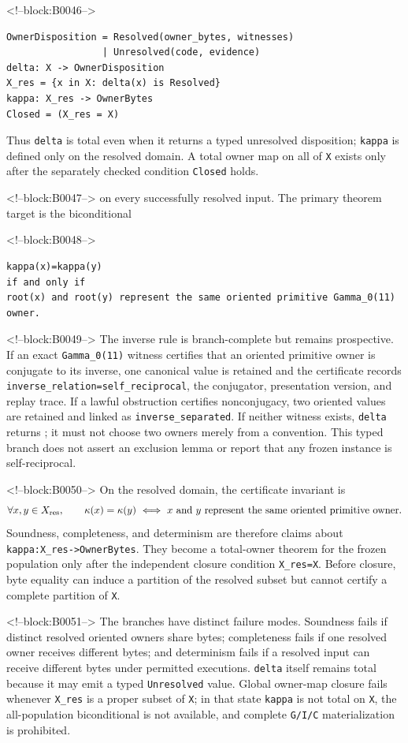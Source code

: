 \documentclass[11pt]{article}
\begin{document}
<!--block:B0046-->
\begin{verbatim}
OwnerDisposition = Resolved(owner_bytes, witnesses)
                 | Unresolved(code, evidence)
delta: X -> OwnerDisposition
X_res = {x in X: delta(x) is Resolved}
kappa: X_res -> OwnerBytes
Closed = (X_res = X)
\end{verbatim}
Thus \texttt{delta} is total even when it returns a typed unresolved disposition;
\texttt{kappa} is defined only on the resolved domain.  A total owner map on all
of \texttt{X} exists only after the separately checked condition
\texttt{Closed} holds.

<!--block:B0047-->
on every successfully resolved input. The primary theorem target is the
biconditional

<!--block:B0048-->
\begin{verbatim}
kappa(x)=kappa(y)
if and only if
root(x) and root(y) represent the same oriented primitive Gamma_0(11) owner.
\end{verbatim}

<!--block:B0049-->
The inverse rule is branch-complete but remains prospective.  If an exact
\texttt{Gamma\_0(11)} witness certifies that an oriented primitive owner is
conjugate to its inverse, one canonical value is retained and the certificate
records \texttt{inverse\_relation=self\_reciprocal}, the conjugator, presentation
version, and replay trace.  If a lawful obstruction certifies nonconjugacy, two
oriented values are retained and linked as \texttt{inverse\_separated}.  If
neither witness exists, \texttt{delta} returns
; it must not choose two owners merely from a
convention.  This typed branch does not assert an exclusion lemma or report that
any frozen instance is self-reciprocal.

<!--block:B0050-->
On the resolved domain, the certificate invariant is
\[
  \forall x,y\in X_{\rm res},\qquad
  \kappa(x)=\kappa(y)\ \Longleftrightarrow\
  x\text{ and }y\text{ represent the same oriented primitive owner}.
\]
Soundness, completeness, and determinism are therefore claims about
\texttt{kappa:X\_res->OwnerBytes}.  They become a total-owner theorem for the
frozen population only after the independent closure condition
\texttt{X\_res=X}.  Before closure, byte equality can induce a partition of the
resolved subset but cannot certify a complete partition of \texttt{X}.

<!--block:B0051-->
The branches have distinct failure modes.  Soundness fails if distinct resolved
oriented owners share bytes; completeness fails if one resolved owner receives
different bytes; and determinism fails if a resolved input can receive different
bytes under permitted executions.  \texttt{delta} itself remains total because
it may emit a typed \texttt{Unresolved} value.  Global owner-map closure fails
whenever \texttt{X\_res} is a proper subset of \texttt{X}; in that state
\texttt{kappa} is not total on \texttt{X}, the all-population biconditional is not
available, and complete \texttt{G/I/C} materialization is prohibited.
\end{document}
